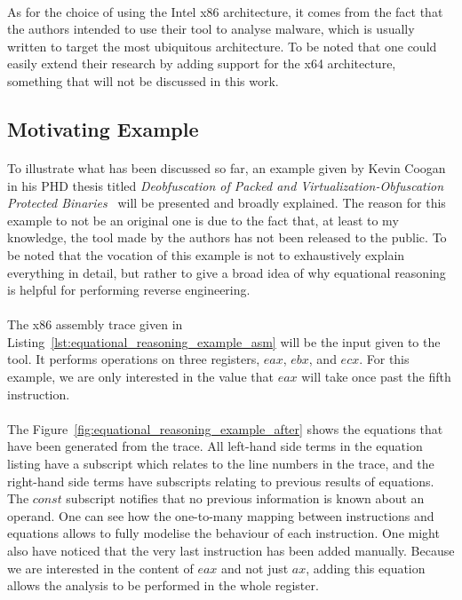 \paragraph{}
As for the choice of using the Intel x86 architecture, it comes from the fact that the authors intended to use their tool to analyse malware, which is usually written to target the most ubiquitous architecture. To be noted that one could easily extend their research by adding support for the x64 architecture, something that will not be discussed in this work.

\subsection{Motivating Example}
\paragraph{}
To illustrate what has been discussed so far, an example given by Kevin Coogan in his PHD thesis titled \textit{Deobfuscation of Packed and Virtualization-Obfuscation Protected Binaries}~\cite{coogan2011deobfuscation} will be presented and broadly explained. The reason for this example to not be an original one is due to the fact that, at least to my knowledge, the tool made by the authors has not been released to the public. To be noted that the vocation of this example is not to exhaustively explain everything in detail, but rather to give a broad idea of why equational reasoning is helpful for performing reverse engineering.

\paragraph{}
The x86 assembly trace given in Listing~\ref{lst:equational_reasoning_example_asm} will be the input given to the tool. It performs operations on three registers, $eax$, $ebx$, and $ecx$. For this example, we are only interested in the value that $eax$ will take once past the fifth instruction. 

\paragraph{}
The Figure~\ref{fig:equational_reasoning_example_after} shows the equations that have been generated from the trace. All left-hand side terms in the equation listing have a subscript which relates to the line numbers in the trace, and the right-hand side terms have subscripts relating to previous results of equations. The $const$ subscript notifies that no previous information is known about an operand. One can see how the one-to-many mapping between instructions and equations allows to fully modelise the behaviour of each instruction. One might also have noticed that the very last instruction has been added manually. Because we are interested in the content of $eax$ and not just $ax$, adding this equation allows the analysis to be performed in the whole register.

